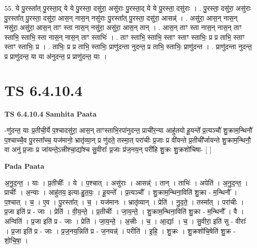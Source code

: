 \documentclass[17pt]{extarticle}
\begin{document}
55. ये पु॒रस्ता᳚त् पु॒रस्ता॒द् ये ये पु॒रस्ता॒ दसु॑रा॒ असु॑राः पु॒रस्ता॒द् ये ये पु॒रस्ता॒ दसु॑राः । . पु॒रस्ता॒ दसु॑रा॒ असु॑राः पु॒रस्ता᳚त् पु॒रस्ता॒ दसु॑रा॒ आस॒न् नास॒न् नसु॑राः पु॒रस्ता᳚त् पु॒रस्ता॒ दसु॑रा॒ आसन्न्॑ । . असु॑रा॒ आस॒न् नास॒न् नसु॑रा॒ असु॑रा॒ आस॒न् ताꣳ स्ता नास॒न् नसु॑रा॒ असु॑रा॒ आस॒न् तान् । . आस॒न् ताꣳ स्ता नास॒न् नास॒न् ताꣳ स्ताभि॒ स्ताभि॒ स्ता नास॒न् नास॒न् ताꣳ स्ताभिः॑ । . ताꣳ स्ताभि॒ स्ताभि॒ स्ताꣳ स्ताꣳ स्ताभिः॒ प्र प्र ताभि॒ स्ताꣳ स्ताꣳ स्ताभिः॒ प्र । . ताभिः॒ प्र प्र ताभि॒ स्ताभिः॒ प्राणु॑दन्ता नुदन्त॒ प्र ताभि॒ स्ताभिः॒ प्राणु॑दन्त । . प्राणु॑दन्ता नुदन्त॒ प्र प्राणु॑दन्त॒ या या अ॑नुदन्त॒ प्र प्राणु॑दन्त॒ याः । \newline
\pagebreak
{}

\section{ TS 6.4.10.4 }

\textbf{TS 6.4.10.4 } \newline
\textbf{Samhita Paata} \newline

-णु॑दन्त॒ याः प्र॒तीची॒र्ये प॒श्चादसु॑रा॒ आस॒न् ताꣳस्ताभि॒रपा॑नुदन्त॒ प्राची॑र॒न्या आहु॑तयो हू॒यन्ते᳚ प्र॒त्यञ्चौ॑ शु॒क्राम॒न्थिनौ॑ प॒श्चाच्चै॒व पु॒रस्ता᳚च्च॒ यज॑मानो॒ भ्रातृ॑व्या॒न् प्र णु॑दते॒ तस्मा॒त् परा॑चीः प्र॒जाः प्र वी॑यन्ते प्र॒तीची᳚र्जायन्ते शु॒क्राम॒न्थिनौ॒ वा अनु॑ प्र॒जाः प्र जा॑यन्ते॒ऽत्त्रीश्चा॒द्या᳚श्च सु॒वीराः᳚ प्र॒जाः प्र॑ज॒नय॒न् परी॑हि शु॒क्रः शु॒क्रशो॑चिषा- [  ] \newline

\textbf{Pada Paata} \newline

अ॒नु॒द॒न्त॒ । याः । प्र॒तीचीः᳚ । ये । प॒श्चात् । असु॑राः । आसन्न्॑ । तान् । ताभिः॑ । अपेति॑ । अ॒नु॒द॒न्त॒ । प्राचीः᳚ । अ॒न्याः । आहु॑तय॒ इत्या-हु॒त॒यः॒ । हू॒यन्ते᳚ । प्र॒त्यञ्चौ᳚ । शु॒क्राम॒न्थिना॒विति॑ शु॒क्रा - म॒न्थिनौ᳚ । प॒श्चात् । च॒ । ए॒व । पु॒रस्ता᳚त् । च॒ । यज॑मानः । भ्रातृ॑व्यान् । प्रेति॑ । नु॒द॒ते॒ । तस्मा᳚त् । परा॑चीः । प्र॒जा इति॑ प्र - जाः । प्रेति॑ । वी॒य॒न्ते॒ । प्र॒तीचीः᳚ । जा॒य॒न्ते॒ । शु॒क्राम॒न्थिना॒विति॑ शु॒क्रा - म॒न्थिनौ᳚ । वै । अन्विति॑ । प्र॒जा इति॑ प्र - जाः । प्रेति॑ । जा॒य॒न्ते॒ । अ॒त्त्रीः । च॒ । आ॒द्याः᳚ । च॒ । सु॒वीरा॒ इति॑ सु - वीराः᳚ । प्र॒जा इति॑ प्र - जाः । प्र॒ज॒नय॒न्निति॑ प्र - ज॒नयन्न्॑ । परीति॑ । इ॒हि॒ । शु॒क्रः । शु॒क्रशो॑चि॒षेति॑ शु॒क्र - शो॒चि॒षा॒ ।  \newline
\end{document}
